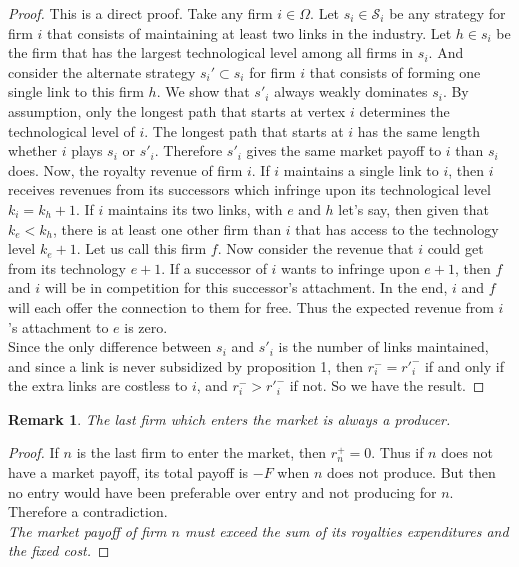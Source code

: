 \documentclass{article}
\newtheorem{remark}{Remark}
\begin{document}
\begin{proof}
This is a direct proof. Take any firm $i\in \Omega$. Let $s_i\in \mathcal{S}_i$ be any strategy for firm $i$ that consists of maintaining at least two links in the industry. Let $h\in s_i$ be the firm that has the largest technological level among all firms in $s_i$. And consider the alternate strategy $s_i'\subset s_i$  for firm $i$ that consists of forming one single link to this firm $h$. We show that $s'_i$ always weakly dominates $s_i$. By assumption, only the longest path that starts at vertex $i$ determines the technological level of $i$. The longest path that starts at $i$ has the same length whether $i$ plays $s_i$ or $s'_i$. Therefore $s'_i$ gives the same market payoff to $i$ than $s_i$ does.
Now, the royalty revenue of firm $i$. If $i$ maintains a single link to $i$, then $i$ receives revenues from its successors which infringe upon its technological level $k_i=k_h+1$. If $i$ maintains its two links, with $e$ and $h$ let's say, then given that $k_e<k_h$, there is at least one other firm than $i$ that has access to the technology level $k_e+1$. Let us call this firm $f$. Now consider the revenue that $i$ could get from its technology $e+1$. If a successor of $i$ wants to infringe upon $e+1$, then $f$ and $i$ will be in competition for this successor's attachment. In the end, $i$ and $f$ will each offer the connection to them for free. Thus the expected revenue from $i$'s attachment to $e$ is zero. \\
Since the only difference between $s_i$ and $s'_i$ is the number of links maintained, and since a link is never subsidized by proposition 1, then $r_i^- = {r'}_i^{-}$ if and only if the extra links are costless to $i$, and $r_i^- > {r'}_i^{-}$ if not. So we have the result. 
\end{proof}


\begin{remark}\label{rem:lastproduces}
The last firm which enters the market is always a producer. 
\end{remark}

\begin{proof}
If $n$ is the last firm to enter the market, then $r^+_n=0$. Thus if $n$ does not have a market payoff, its total payoff is $-F$ when $n$ does not produce. But then no entry would have been preferable over entry and not producing for $n$. Therefore a contradiction. \\
\indent \textit{The market payoff of firm $n$ must exceed the sum of its royalties expenditures and the fixed cost.}
\end{proof}
\end{document}
